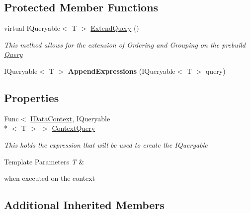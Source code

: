\subsection*{Protected Member Functions}
\begin{DoxyCompactItemize}
\item 
virtual I\-Queryable$<$ T $>$ \hyperlink{class_framework_extension_1_1_core_1_1_query_objects_1_1_query-g_ac3a35701978540f4bab19f1785bb883c}{Extend\-Query} ()
\begin{DoxyCompactList}\small\item\em This method allows for the extension of Ordering and Grouping on the prebuild \hyperlink{class_framework_extension_1_1_core_1_1_query_objects_1_1_query-g}{Query} \end{DoxyCompactList}\item 
\hypertarget{class_framework_extension_1_1_core_1_1_query_objects_1_1_query-g_a86dbe1ad637e2f996819c41364f2eb4c}{I\-Queryable$<$ T $>$ {\bfseries Append\-Expressions} (I\-Queryable$<$ T $>$ query)}\label{class_framework_extension_1_1_core_1_1_query_objects_1_1_query-g_a86dbe1ad637e2f996819c41364f2eb4c}

\end{DoxyCompactItemize}
\subsection*{Properties}
\begin{DoxyCompactItemize}
\item 
Func$<$ \hyperlink{interface_framework_extension_1_1_core_1_1_interfaces_1_1_i_data_context}{I\-Data\-Context}, I\-Queryable\\*
$<$ T $>$ $>$ \hyperlink{class_framework_extension_1_1_core_1_1_query_objects_1_1_query-g_afc262d00f1a554c09fe74d2079d5e4c7}{Context\-Query}
\begin{DoxyCompactList}\small\item\em This holds the expression that will be used to create the I\-Queryable
\begin{DoxyTemplParams}{Template Parameters}
{\em T} & \\
\hline
\end{DoxyTemplParams}
when executed on the context \end{DoxyCompactList}\end{DoxyCompactItemize}
\subsection*{Additional Inherited Members}



